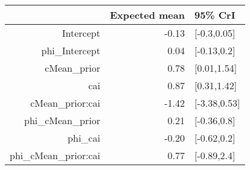 \begin{tabular}{rrl}
  \hline
 & Expected mean & 95\% CrI \\ 
  \hline
Intercept & -0.13 & [-0.3,0.05] \\ 
  phi\_Intercept & 0.04 & [-0.13,0.2] \\ 
  cMean\_prior & 0.78 & [0.01,1.54] \\ 
  cai & 0.87 & [0.31,1.42] \\ 
  cMean\_prior:cai & -1.42 & [-3.38,0.53] \\ 
  phi\_cMean\_prior & 0.21 & [-0.36,0.8] \\ 
  phi\_cai & -0.20 & [-0.62,0.2] \\ 
  phi\_cMean\_prior:cai & 0.77 & [-0.89,2.4] \\ 
   \hline
\end{tabular}

